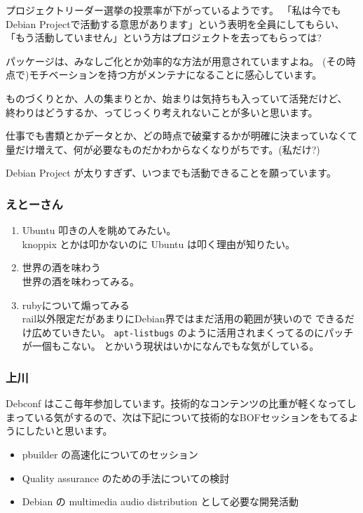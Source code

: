\documentclass[mingoth,a4paper]{jsarticle}
\begin{document}
プロジェクトリーダー選挙の投票率が下がっているようです。
「私は今でもDebian Projectで活動する意思があります」という表明を全員にしてもらい、
「もう活動していません」という方はプロジェクトを去ってもらっては?

パッケージは、みなしご化とか効率的な方法が用意されていますよね。
(その時点で)モチベーションを持つ方がメンテナになることに感心しています。

ものづくりとか、人の集まりとか、始まりは気持ちも入っていて活発だけど、
終わりはどうするか、ってじっくり考えれないことが多いと思います。

仕事でも書類とかデータとか、どの時点で破棄するかが明確に決まっていなくて
量だけ増えて、何が必要なものだかわからなくなりがちです。(私だけ?)

Debian Project が太りすぎず、いつまでも活動できることを願っています。

\subsubsection{えとーさん}

\begin{enumerate}
  
 \item  Ubuntu 叩きの人を眺めてみたい。\\
 knoppix とかは叩かないのに Ubuntu は叩く理由が知りたい。

 \item 世界の酒を味わう\\
 世界の酒を味わってみる。

 \item rubyについて煽ってみる\\
 rail以外限定だがあまりにDebian界ではまだ活用の範囲が狭いので
 できるだけ広めていきたい。
 \texttt{apt-listbugs} のように活用されまくってるのにパッチが一個もこない。
 とかいう現状はいかになんでもな気がしている。
\end{enumerate}




\subsubsection{上川}

Debconf はここ毎年参加しています。技術的なコンテンツの比重が軽くなってし
まっている気がするので、次は下記について技術的なBOFセッションをもてるよ
うにしたいと思います。

\begin{itemize}
 \item pbuilder の高速化についてのセッション
 \item Quality assurance のための手法についての検討
 \item Debian の multimedia audio distribution として必要な開発活動
\end{itemize}
\end{document}
